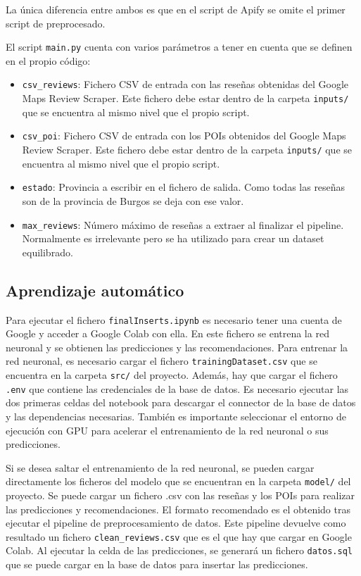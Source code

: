 La única diferencia entre ambos es que en el script de Apify se omite el primer script de preprocesado.

El script \texttt{main.py} cuenta con varios parámetros a tener en cuenta que se definen en el propio código:
\begin{itemize}
    \item \texttt{csv\_reviews}: Fichero CSV de entrada con las reseñas obtenidas del Google Maps Review Scraper. Este fichero debe estar dentro de la carpeta \texttt{inputs/} que se encuentra al mismo nivel que el propio script.
    \item \texttt{csv\_poi}: Fichero CSV de entrada con los POIs obtenidos del Google Maps Review Scraper. Este fichero debe estar dentro de la carpeta \texttt{inputs/} que se encuentra al mismo nivel que el propio script.
    \item \texttt{estado}: Provincia a escribir en el fichero de salida. Como todas las reseñas son de la provincia de Burgos se deja con ese valor.
    \item \texttt{max\_reviews}: Número máximo de reseñas a extraer al finalizar el pipeline. Normalmente es irrelevante pero se ha utilizado para crear un dataset equilibrado.
\end{itemize}

\subsection{Aprendizaje automático}

Para ejecutar el fichero \texttt{finalInserts.ipynb} es necesario tener una cuenta de Google y acceder a Google Colab con ella.
En este fichero se entrena la red neuronal y se obtienen las predicciones y las recomendaciones.
Para entrenar la red neuronal, es necesario cargar el fichero \texttt{trainingDataset.csv} que se encuentra en la carpeta \texttt{src/} del proyecto.
Además, hay que cargar el fichero \texttt{.env} que contiene las credenciales de la base de datos.
Es necesario ejecutar las dos primeras celdas del notebook para descargar el connector de la base de datos y las dependencias necesarias.
También es importante seleccionar el entorno de ejecución con GPU para acelerar el entrenamiento de la red neuronal o sus predicciones.

Si se desea saltar el entrenamiento de la red neuronal, se pueden cargar directamente los ficheros del modelo que se encuentran en la carpeta \texttt{model/} del proyecto.
Se puede cargar un fichero .csv con las reseñas y los POIs para realizar las predicciones y recomendaciones.
El formato recomendado es el obtenido tras ejecutar el pipeline de preprocesamiento de datos. Este pipeline devuelve como resultado un fichero \texttt{clean\_reviews.csv} que es el que hay que cargar en Google Colab.
Al ejecutar la celda de las predicciones, se generará un fichero \texttt{datos.sql} que se puede cargar en la base de datos para insertar las predicciones.

